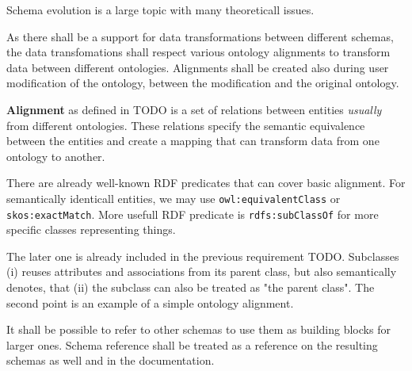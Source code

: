 Schema evolution is a large topic with many theoreticall issues.




\begin{requirement}
    As there shall be a support for data transformations between different schemas, the data transfomations shall respect various ontology alignments to transform data between different ontologies. Alignments shall be created also during user modification of the ontology, between the modification and the original ontology.
\end{requirement}

\textbf{Alignment} as defined in TODO is a set of relations between entities \textit{usually} from different ontologies. These relations specify the semantic equivalence between the entities and create a mapping that can transform data from one ontology to another.

There are already well-known RDF predicates that can cover basic alignment. For semantically identicall entities, we may use \verb|owl:equivalentClass| or \verb|skos:exactMatch|. More usefull RDF predicate is \verb|rdfs:subClassOf| for more specific classes representing things.

The later one is already included in the previous requirement TODO. Subclasses (i) reuses attributes and associations from its parent class, but also semantically denotes, that (ii) the subclass can also be treated as "the parent class". The second point is an example of a simple ontology alignment.

\begin{showcase}
\end{showcase}







\begin{requirement}
    It shall be possible to refer to other schemas to use them as building blocks for larger ones. Schema reference shall be treated as a reference on the resulting schemas as well and in the documentation.
\end{requirement}

